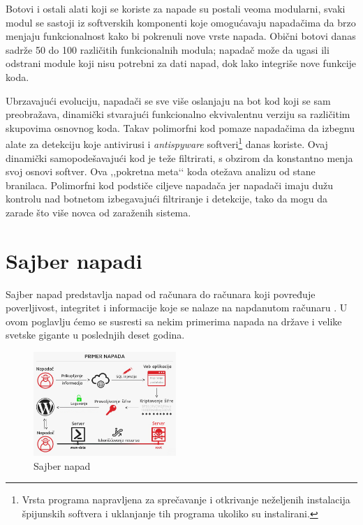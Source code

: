 \documentclass[a4paper]{article}
\theoremstyle{break}
\begin{document}
{Botovi i ostali alati koji se koriste za napade su postali veoma modularni, svaki modul se sastoji iz softverskih komponenti koje omogućavaju napadačima da brzo menjaju funkcionalnost kako bi pokrenuli nove vrste napada. Obični botovi danas sadrže 50 do 100 različitih funkcionalnih modula; napadač može da ugasi ili odstrani module koji nisu potrebni za dati napad, dok lako integriše nove funkcije koda. 

Ubrzavajući evoluciju, napadači se sve više oslanjaju na bot kod koji se sam preobražava, dinamički stvarajući funkcionalno ekvivalentnu verziju sa različitim skupovima osnovnog koda. Takav polimorfni kod pomaze napadačima da izbegnu alate za detekciju koje antivirusi i \textit{antispyware} softveri\footnote{Vrsta programa napravljena za sprečavanje i otkrivanje neželjenih instalacija špijunskih softvera i uklanjanje tih programa ukoliko su instalirani.} danas koriste. Ovaj dinamički samopodešavajući kod je teže filtrirati, s obzirom da konstantno menja svoj osnovi softver. Ova ,,pokretna meta‘‘ koda otežava analizu od stane branilaca. Polimorfni kod podstiče ciljeve napadača jer napadači imaju dužu kontrolu nad botnetom izbegavajući filtriranje i detekcije, tako da mogu da zarade što više novca od zaraženih sistema.

\section{Sajber napadi}
\label{sec:sajber_napadi}

Sajber napad predstavlja napad od računara do računara koji povređuje poverljivost, integritet i informacije koje se nalaze na napdanutom računaru \cite{knjiga}. U ovom poglavlju ćemo se susresti sa nekim primerima napada na države i velike svetske gigante u poslednjih deset godina.

\clearpage

\begin{figure}[h!]
\begin{center}
\includegraphics[width=0.48\textwidth]{napad.png}
\caption{Sajber napad}
\end{center}
\end{figure}

}
\end{document}
